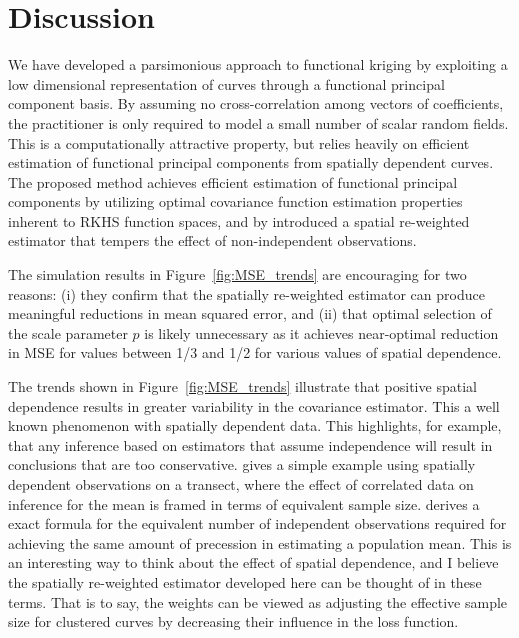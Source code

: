 
\section{Discussion} %
\label{sec:discussion}
 We have developed a parsimonious approach to functional kriging by exploiting a low dimensional representation of curves through a functional principal component basis. By assuming no cross-correlation among vectors of coefficients, the practitioner is only required to model a small number of scalar random fields. This is a computationally attractive property, but relies heavily on efficient estimation of functional principal components from spatially dependent curves.  The proposed method achieves efficient estimation of functional principal components by utilizing optimal covariance function estimation properties inherent to RKHS function spaces, and by introduced a spatial re-weighted estimator that tempers the effect of non-independent observations. 
 
 The simulation results in Figure~\ref{fig:MSE_trends} are encouraging for two reasons: (i) they confirm that the spatially re-weighted estimator can produce meaningful reductions in mean squared error, and (ii) that optimal selection of the scale parameter $p$ is likely unnecessary as it achieves near-optimal reduction in MSE for values between 1/3 and 1/2 for various values of spatial dependence.

The trends shown in Figure~\ref{fig:MSE_trends} illustrate that positive spatial dependence results in greater variability in the covariance estimator. This a well known phenomenon with spatially dependent data. This highlights, for example, that any inference based on estimators that assume independence will result in conclusions that are too conservative. \cite{cressie1993statistics} gives a simple example using spatially dependent observations on a transect, where the effect of correlated data on inference for the mean is framed in terms of equivalent sample size. \cite{cressie1993statistics} derives a exact formula for the equivalent number of independent observations required for achieving the same amount of precession in estimating a population mean. This is an interesting way to think about the effect of spatial dependence, and I believe the spatially re-weighted estimator developed here can be thought of in these terms. That is to say, the weights can be viewed as adjusting the effective sample size for clustered curves by decreasing their influence in the loss function. 

